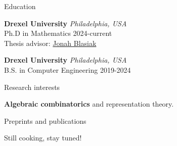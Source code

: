 \documentclass[
	11pt, %
]{resume} %
\begin{document}
\begin{rSection}{Education}
	
    \textbf{Drexel University} 
    \hfill \textit{Philadelphia, USA} \\
    Ph.D in Mathematics
    \hfill 2024-current \\
    Thesis advisor: \href{https://www.math.drexel.edu/~jblasiak/}{Jonah Blasiak}

    \textbf{Drexel University} \hfill \textit{Philadelphia, USA} \\
    B.S. in Computer Engineering
    \hfill 2019-2024

\end{rSection}


\begin{rSection}{Research interests}

    \textbf{Algebraic combinatorics} and representation theory. 

\end{rSection}


\begin{rSection}{Preprints and publications}

    Still cooking, stay tuned!

\end{rSection}
\end{document}

